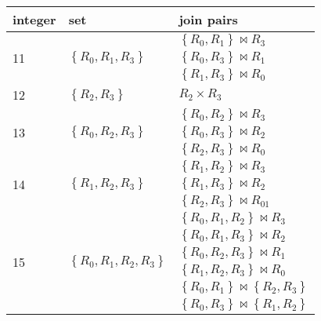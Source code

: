 \documentclass[12pt]{scrartcl}
\begin{document}
\begin{enumerate}
	\begin{table}[H]
		\begin{center}
			\begin{tabular}{lll}
				\hline
				integer &set & join pairs \\ \hline
				\multirow{3}{*}{11}	&\multirow{3}{*}{$\left\lbrace R_{0}, R_{1}, R_{3}\right\rbrace$}	& $\left\lbrace R_{0}, R_{1}\right\rbrace \bowtie R_{3}$ \\
									&																	& $\left\lbrace R_{0}, R_{3}\right\rbrace \bowtie R_{1}$ \\ 
									&																	& $\left\lbrace R_{1}, R_{3}\right\rbrace \bowtie R_{0}$ \\ \hline
				12	&$\left\lbrace R_{2}, R_{3}\right\rbrace $     & $R_{2} \times R_{3}$				\\ \hline
				\multirow{3}{*}{13}	&\multirow{3}{*}{$\left\lbrace R_{0}, R_{2}, R_{3}\right\rbrace$}	& $\left\lbrace R_{0}, R_{2}\right\rbrace \bowtie R_{3}$ \\
									&																	& $\left\lbrace R_{0}, R_{3}\right\rbrace \bowtie R_{2}$ \\ 
									&																	& $\left\lbrace R_{2}, R_{3}\right\rbrace \bowtie R_{0}$ \\ \hline
				\multirow{3}{*}{14}	&\multirow{3}{*}{$\left\lbrace R_{1}, R_{2}, R_{3}\right\rbrace$}	& $\left\lbrace R_{1}, R_{2}\right\rbrace \bowtie R_{3}$ \\
									&																	& $\left\lbrace R_{1}, R_{3}\right\rbrace \bowtie R_{2}$ \\ 
									&																	& $\left\lbrace R_{2}, R_{3}\right\rbrace \bowtie R_{01}$ \\ \hline
				\multirow{6}{*}{15}	&\multirow{6}{*}{$\left\lbrace R_{0}, R_{1}, R_{2}, R_{3}\right\rbrace$}	& $\left\lbrace R_{0}, R_{1}, R_{2}\right\rbrace \bowtie R_{3}$ \\
									&																			& $\left\lbrace R_{0}, R_{1}, R_{3}\right\rbrace \bowtie R_{2}$ \\
									&																			& $\left\lbrace R_{0}, R_{2}, R_{3}\right\rbrace \bowtie R_{1}$ \\
									&																			& $\left\lbrace R_{1}, R_{2}, R_{3}\right\rbrace \bowtie R_{0}$ \\ 
									&																			& $\left\lbrace R_{0}, R_{1}\right\rbrace \bowtie \left\lbrace R_{2}, R_{3}\right\rbrace $ \\
									&																			& $\left\lbrace R_{0}, R_{3}\right\rbrace \bowtie \left\lbrace R_{1}, R_{2}\right\rbrace $ \\ \hline

\end{tabular}
\end{center}
\end{table}
\end{enumerate}
\end{document}
